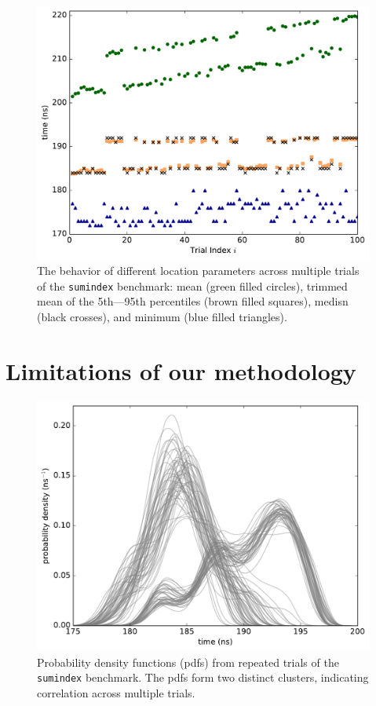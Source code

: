 \documentclass[conference]{IEEEtran}
\begin{document}
\begin{figure}
\centering
\includegraphics[width=\columnwidth]{figures/fig3/location_estimators_sumindex}
\caption{The behavior of different location parameters across multiple trials of
the \lstinline|sumindex| benchmark: mean (green filled circles), trimmed mean of
the 5th---95th percentiles (brown filled squares), medisn (black crosses), and
minimum (blue filled triangles).}
\label{fig:locationmeasures}
\end{figure}

\label{sec:limits}
\section{Limitations of our methodology}

\begin{figure}[!t]
\centering
\includegraphics[width=\columnwidth]{figures/fig4/kde_pdf_sumindex}
\caption{Probability density functions (pdfs) from repeated trials of the
\lstinline|sumindex| benchmark. The pdfs form two distinct clusters, indicating
correlation across multiple trials.}
\label{fig:pdfsumindex}
\end{figure}
\end{document}

